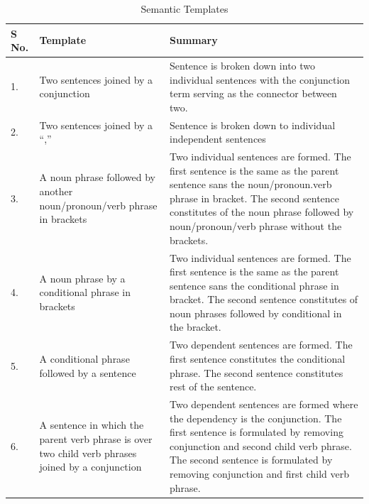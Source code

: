 \begin{table}
\begin{center}

\caption{Semantic Templates}
    \begin{tabular}{ | l | p{5cm} |p{10cm} |}
    \hline
    \textbf{S No.} 	& \textbf{Template} & \textbf{Summary} \\ \hline
    
    1. 		& Two sentences joined by a conjunction & Sentence is broken down into two individual sentences with the conjunction term serving as the connector between two. \\ \hline
    2. 		& Two sentences joined by a ``,''& Sentence is broken down to individual independent sentences \\ \hline
    3.		& A noun phrase followed by another noun/pronoun/verb phrase in brackets & Two individual sentences are formed. The first sentence is  the same as the parent sentence sans the noun/pronoun.verb phrase in bracket. The second sentence constitutes of the noun phrase followed by  noun/pronoun/verb phrase without the brackets.\\ \hline
    4.		& A noun phrase by a conditional phrase in brackets & Two individual sentences are formed. The first sentence is the same as the parent sentence sans the conditional phrase in bracket. The second sentence constitutes of noun phrases followed by conditional in the bracket.\\ \hline
    5.		& A conditional phrase followed by a sentence & Two dependent sentences are formed. The first sentence constitutes the conditional phrase. The second sentence constitutes rest of the sentence.\\ \hline
    6.		& A sentence in which the parent verb phrase is over two child verb phrases joined by a conjunction & Two dependent sentences are formed where the dependency is the conjunction. The first sentence is formulated by removing conjunction and second child verb phrase. The second sentence is formulated by removing conjunction and first child verb phrase. \\ \hline
    \end{tabular}
	\label{tab:semanticTemplates}
\end{center}
\end{table}







